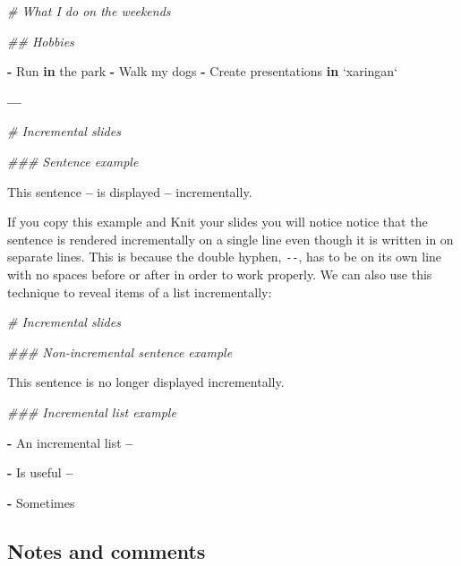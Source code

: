 \documentclass[
]{book}
\newenvironment{Shaded}{\begin{snugshade}}{\end{snugshade}}
\newcommand{\CommentTok}[1]{\textcolor[rgb]{0.37,0.37,0.37}{\textit{#1}}}
\newcommand{\ControlFlowTok}[1]{\textcolor[rgb]{0.27,0.27,0.27}{\textbf{#1}}}
\newcommand{\DataTypeTok}[1]{\textcolor[rgb]{0.27,0.27,0.27}{#1}}
\newcommand{\NormalTok}[1]{#1}
\newcommand{\OperatorTok}[1]{\textcolor[rgb]{0.43,0.43,0.43}{\textbf{#1}}}
\newcommand{\StringTok}[1]{\textcolor[rgb]{0.5,0.5,0.5}{#1}}
\begin{document}
\begin{Shaded}
\begin{Highlighting}[]
\CommentTok{# What I do on the weekends}

\CommentTok{## Hobbies}

\OperatorTok{-}\StringTok{ }\NormalTok{Run }\ControlFlowTok{in}\NormalTok{ the park}
\OperatorTok{-}\StringTok{ }\NormalTok{Walk my dogs}
\OperatorTok{-}\StringTok{ }\NormalTok{Create presentations }\ControlFlowTok{in} \StringTok{`}\DataTypeTok{xaringan}\StringTok{`}

\OperatorTok{---}

\CommentTok{# Incremental slides}

\CommentTok{### Sentence example}

\NormalTok{This sentence}
\OperatorTok{--}
\NormalTok{is displayed }
\OperatorTok{--}
\NormalTok{incrementally. }
\end{Highlighting}
\end{Shaded}

If you copy this example and Knit your slides you will notice notice that the sentence is rendered incrementally on a single line even though it is written in on separate lines. This is because the double hyphen, \texttt{-\/-}, has to be on its own line with no spaces before or after in order to work properly. We can also use this technique to reveal items of a list incrementally:

\begin{Shaded}
\begin{Highlighting}[]
\CommentTok{# Incremental slides}

\CommentTok{### Non-incremental sentence example}

\NormalTok{This sentence is no longer displayed incrementally. }

\CommentTok{### Incremental list example}

\OperatorTok{-}\StringTok{ }\NormalTok{An incremental list}
\OperatorTok{--}

\OperatorTok{-}\StringTok{ }\NormalTok{Is useful}
\OperatorTok{--}

\OperatorTok{-}\StringTok{ }\NormalTok{Sometimes}
\end{Highlighting}
\end{Shaded}

\hypertarget{notes-and-comments}{%
\subsection{Notes and comments}\label{notes-and-comments}}
\end{document}
